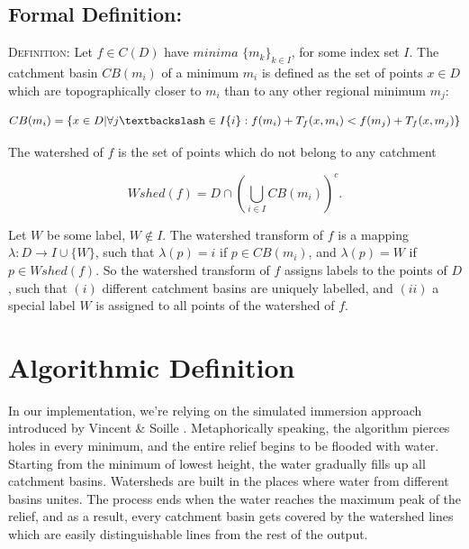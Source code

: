 \documentclass{article}
\begin{document}
\subsection{Formal Definition:}
\begin{flushleft}
\vspace{2mm }
\begin{tcolorbox}
\textsc{Definition:}\cite{parwshed} \newline\newline
Let $f \in C(D)$ have $minima$ $\{m_{k}\}_{k \in I}$, for some index set $I$. The catchment basin $CB(m_i)$ of a minimum $m_i$ is defined as the set of points $x \in D$ which are topographically closer to $m_i$ than to any other regional minimum $m_j$:
\begin{center}
\begin{equation*}
    CB(m_i) = \{x \in D | \forall j \textbackslash \in I\{i\} : f(m_i) + T_f(x, m_i) < f(m_j) + T_f(x, m_j)\}
\end{equation*}
\end{center}
\vspace{2mm}
The watershed of $f$ is the set of points which do not belong to any catchment
\begin{center}
\begin{equation*}
Wshed(f) = D \cap \left(\bigcup\limits_{i \in I} CB(m_i)\right)^c.
\end{equation*}
\end{center}
\vspace{4mm}
Let $W$ be some label, $W \notin I$. The watershed transform of $f$ is a mapping $\lambda : D \to I \cup \{W\}$, such that $\lambda(p) = i$ if $p \in CB(m_i)$, and $\lambda(p) = W$ if $p \in Wshed(f)$.
\newline\newline\newline
So the watershed transform of $f$ assigns labels to the points of $D$, such that $(i)$ different catchment basins are uniquely labelled, and $(ii)$ a special label $W$ is assigned to all points of the watershed of $f$.
\end{tcolorbox}
\end{flushleft}



\section{Algorithmic Definition}
\vspace{2mm}In our implementation, we're relying on the simulated immersion approach introduced by Vincent \& Soille \cite{soilletextbook}. \newline\newline
Metaphorically speaking, the algorithm pierces holes in every minimum, and the entire relief begins to be flooded with water. Starting from the minimum of lowest height, the water gradually fills up all catchment basins. Watersheds are built in the places where water from different basins unites. The process ends when the water reaches the maximum peak of the relief, and as a result, every catchment basin gets covered by the watershed lines which are easily distinguishable lines from the rest of the output.
\end{document}
